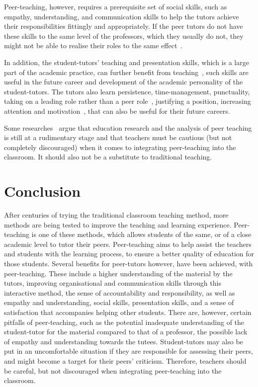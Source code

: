 \documentclass[12pt,helvetica,a4paper,final]{iopart}
\begin{document}
\par{}
Peer-teaching, however, requires a prerequisite set of social skills, such as empathy, understanding, and communication skills to help the tutors achieve their responsibilities fittingly and appropriately. If the peer tutors do not have these skills to the same level of the professors, which they usually do not, they might not be able to realise their roles to the same effect~\cite{theory}.

\par{}
In addition, the student-tutors' teaching and presentation skills, which is a large part of the academic practice, can further benefit from teaching~\cite{stem}, such skills are useful in the future career and development of the academic personality of the student-tutors. The tutors also learn persistence, time-management, punctuality, taking on a leading role rather than a peer role~\cite{theory},  justifying a position, increasing attention and motivation~\cite{dundee}, that can also be useful for their future careers.

\par{}
Some researches~\cite{learntwice} argue that education research and the analysis of peer teaching is still at a rudimentary stage and that teachers must be cautious (but not completely discouraged) when it comes to integrating peer-teaching into the classroom. It should also not be a substitute to traditional teaching.

\section{Conclusion}
After centuries of trying the traditional classroom teaching method, more methods are being tested to improve the teaching and learning experience. Peer-teaching is one of these methods, which allows students of the same, or of a close academic level to tutor their peers. Peer-teaching aims to help assist the teachers and students with the learning process, to ensure a better quality of education for those students. Several benefits for peer-tutors however, have been achieved, with peer-teaching. These include a higher understanding of the material by the tutors, improving organisational and communication skills through this interactive method, the sense of accountability and responsibility, as well as empathy and understanding, social skills, presentation skills, and a sense of satisfaction that accompanies helping other students. There are, however, certain pitfalls of peer-teaching, such as the potential inadequate understanding of the student-tutor for the material compared to that of a professor, the possible lack of empathy and understanding towards the tutees. Student-tutors may also be put in an uncomfortable situation if they are responsible for assessing their peers, and might become a target for their peers' criticism. Therefore, teachers should be careful, but not discouraged when integrating peer-teaching into the classroom.
{\small
}
\end{document}

